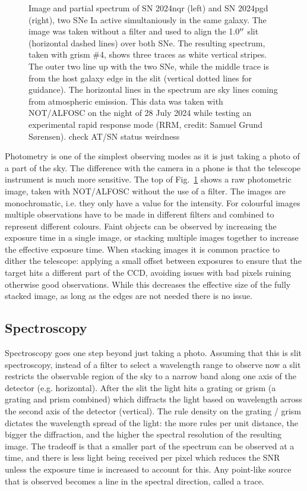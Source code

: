\documentclass[a4paper,oneside,12pt, class=Latex/Classes/PhDthesisPSnPDF, crop=false]{standalone}
\begin{document}
\begin{figure}
    \caption{Image and partial spectrum of SN 2024nqr (left) and SN 2024pgd (right), two SNe Ia active simultaniously in the same galaxy. The image was taken without a filter and used to align the 1.0$^{\prime\prime}$ slit (horizontal dashed lines) over both SNe. The resulting spectrum, taken with grism \#4, shows three traces as white vertical stripes. The outer two line up with the two SNe, while the middle trace is from the host galaxy edge in the slit (vertical dotted lines for guidance). The horizontal lines in the spectrum are sky lines coming from atmospheric emission. This data was taken with NOT/ALFOSC on the night of 28 July 2024 while testing an experimental rapid response mode (RRM, credit: Samuel Grund S\o rensen). \color{red}check AT/SN status weirdness \color{black}}
    \label{phot_spec_example}
\end{figure}


Photometry is one of the simplest observing modes as it is just taking a photo of a part of the sky. The difference with the camera in a phone is that the telescope instrument is much more sensitive. The top of Fig.~\ref{phot_spec_example} shows a raw photometric image, taken with NOT/ALFOSC without the use of a filter. The images are monochromatic, i.e. they only have a value for the intensity. For colourful images multiple observations have to be made in different filters and combined to represent different colours. Faint objects can be observed by increasing the exposure time in a single image, or stacking multiple images together to increase the effective exposure time. When stacking images it is common practice to dither the telescope: applying a small offset between exposures to ensure that the target hits a different part of the CCD, avoiding issues with bad pixels ruining otherwise good observations. While this decreases the effective size of the fully stacked image, as long as the edges are not needed there is no issue.


\subsection{Spectroscopy}
Spectroscopy goes one step beyond just taking a photo. Assuming that this is slit spectroscopy, instead of a filter to select a wavelength range to observe now a slit restricts the observable region of the sky to a narrow band along one axis of the detector (e.g. horizontal). After the slit the light hits a grating or grism (a grating and prism combined) which diffracts the light based on wavelength across the second axis of the detector (vertical). The rule density on the grating / grism dictates the wavelength spread of the light: the more rules per unit distance, the bigger the diffraction, and the higher the spectral resolution of the resulting image. The tradeoff is that a smaller part of the spectrum can be observed at a time, and there is less light being received per pixel which reduces the SNR unless the exposure time is increased to account for this. Any point-like source that is observed becomes a line in the spectral direction, called a trace.
\end{document}

